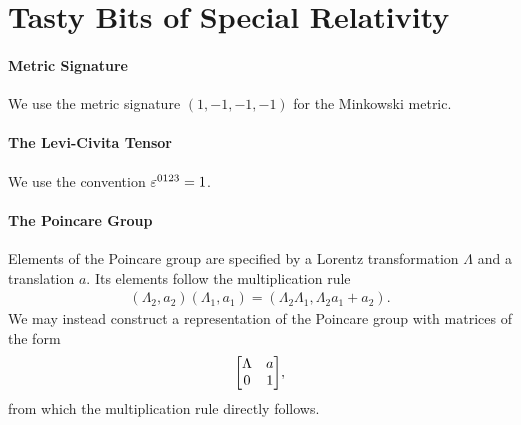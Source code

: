 \section{Tasty Bits of Special Relativity}

\paragraph{Metric Signature}
We use the metric signature $(1, -1, -1, -1)$ for the Minkowski metric.

\paragraph{The Levi-Civita Tensor}
We use the convention $\tensor{\varepsilon}{^{0123}} = 1$.

\paragraph{The Poincare Group}
Elements of the Poincare group are specified by a Lorentz transformation $\Lambda$ and a translation $a$. Its elements follow the multiplication rule
\begin{align*}
	(\Lambda_{2}, a_{2})(\Lambda_{1}, a_{1}) = (\Lambda_{2}\Lambda_{1}, \Lambda_{2}a_{1} + a_{2}).
\end{align*}
We may instead construct a representation of the Poincare group with matrices of the form
\begin{align*}
	\mqty[
		\Lambda & a \\
		0       & 1
	],
\end{align*}
from which the multiplication rule directly follows.

